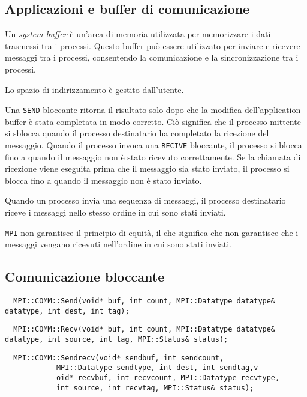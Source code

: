 \subsection{Applicazioni e buffer di comunicazione}
Un \textit{system buffer} è un'area di memoria utilizzata
per memorizzare i dati trasmessi tra i processi. Questo
buffer può essere utilizzato per inviare e ricevere messaggi
tra i processi, consentendo la comunicazione e la sincronizzazione
tra i processi.

Lo spazio di indirizzamento è gestito dall'utente.

Una \texttt{SEND} bloccante ritorna il risultato solo dopo che la 
modifica dell'application buffer è stata completata in modo 
corretto.
Ciò significa che il processo mittente si sblocca quando il processo 
destinatario ha completato la ricezione del messaggio.
Quando il processo invoca una \texttt{RECIVE} bloccante, il processo
si blocca fino a quando il messaggio non è stato ricevuto correttamente.
Se la chiamata di ricezione viene eseguita prima che il messaggio sia
stato inviato, il processo si blocca fino a quando il messaggio non è
stato inviato.

Quando un processo invia una sequenza di messaggi, il processo
destinatario riceve i messaggi nello stesso ordine in cui sono stati
inviati.

\texttt{MPI} non garantisce il principio di equità, il che significa
che non garantisce che i messaggi vengano ricevuti nell'ordine in cui
sono stati inviati.

\subsection{Comunicazione bloccante}
\begin{lstlisting}
  MPI::COMM::Send(void* buf, int count, MPI::Datatype datatype& datatype, int dest, int tag);
\end{lstlisting}

\begin{lstlisting}
  MPI::COMM::Recv(void* buf, int count, MPI::Datatype datatype& datatype, int source, int tag, MPI::Status& status);
\end{lstlisting}

\begin{lstlisting}
  MPI::COMM::Sendrecv(void* sendbuf, int sendcount, 
            MPI::Datatype sendtype, int dest, int sendtag,v
            oid* recvbuf, int recvcount, MPI::Datatype recvtype,
            int source, int recvtag, MPI::Status& status);
\end{lstlisting}

